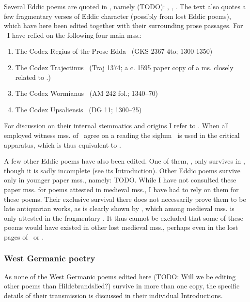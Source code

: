     Several Eddic poems are quoted in \Gylfaginning, namely (TODO): \Voluspa, \Vafthrudnismal, \Grimnismal. The text also quotes a few fragmentary verses of Eddic character (possibly from lost Eddic poems), which have here been edited together with their surrounding prose passages. For \Gylfaginning\ I have relied on the following four main mss.:\begin{enumerate}
	   \item The Codex Regius of the Prose Edda \RegiusProse\ (GKS 2367 4to; 1300-1350)
     \item The Codex Trajectinus \Trajectinus\ (Traj 1374; a c. 1595 paper copy of a ms. closely related to \RegiusProse.)
     \item The Codex Wormianus \Wormianus\ (AM 242 fol.; 1340–70)
     \item The Codex Upsaliensis \Upsaliensis\ (DG 11; 1300–25)\end{enumerate}

    For discussion on their internal stemmatics and origins I refer to \textcite{Haukur2017}. When all employed witness mss. of \Gylfaginning\ agree on a reading the siglum \GylfMS\ is used in the critical apparatus, which is thus equivalent to \RegiusProse\Trajectinus\Wormianus\Upsaliensis.

    A few other Eddic poems have also been edited. One of them, \Rigsthula, only survives in \Wormianus, though it is sadly incomplete (see its Introduction). Other Eddic poems survive only in younger paper mss., namely: TODO. While I have not consulted these paper mss. for poems attested in medieval mss., I have had to rely on them for these poems. Their exclusive survival there does not necessarily prove them to be late antiquarian works, as is clearly shown by \Baldrsdraumar, which among medieval mss. is only attested in the fragmentary \AM. It thus cannot be excluded that some of these poems would have existed in other lost medieval mss., perhaps even in the lost pages of \Regius\ or \AM.

    \subsubsection{West Germanic poetry}

    As none of the West Germanic poems edited here (TODO: Will we be editing other poems than Hildebrandslied?) survive in more than one copy, the specific details of their transmission is discussed in their individual Introductions.

  \printbibliography%
